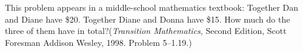 This problem appears in a middle-school mathematics textbook:  Together Dan and Diane have \$20. Together Diane and Donna have \$15.  How much do the three of them have in total?\quad   ({\sl Transition Mathematics}, Second Edition, Scott Foresman Addison Wesley, 1998. Problem 5--1.19.)